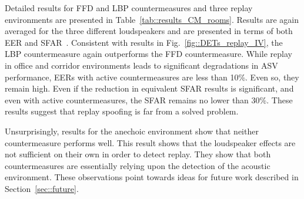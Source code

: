 Detailed results for FFD and LBP countermeasures and three replay environments are presented in Table~\ref{tab::results_CM_rooms}.  Results are again averaged for the three different loudspeakers and are presented in terms of both EER and SFAR~\cite{Johnson2010}.  
Consistent with results in Fig.~\ref{fig::DETs_replay_IV}, the LBP countermeasure again outperforms the FFD countermeasure.  While replay in office and corridor environments leads to significant degradations in ASV performance, EERs with active countermeasures are less than 10\%.  Even so, they remain high.  Even if the reduction in equivalent SFAR results is significant, and even with active countermeasures, the SFAR remains no lower than 30\%.  These results suggest that replay spoofing is far from a solved problem. 

Unsurprisingly, results for the anechoic environment show that neither countermeasure performs well.  This result shows that the loudspeaker effects are not sufficient on their own in order to detect replay.  They show that both countermeasures are essentially relying upon the detection of the acoustic environment.  These observations point towards ideas for future work described in Section~\ref{sec::future}.




